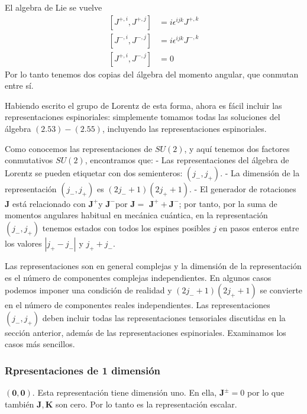                         El algebra de Lie se vuelve
                        $$
\begin{align*}
{\left[J^{+, i}, J^{+, j}\right] } & =i \epsilon^{i j k} J^{+, k}  \tag{2.53}\\
{\left[J^{-, i}, J^{-, j}\right] } & =i \epsilon^{i j k} J^{-, k}  \tag{2.54}\\
{\left[J^{+, i}, J^{-, j}\right] } & =0 \tag{2.55}
\end{align*}
$$
Por lo tanto tenemos dos copias del álgebra del momento angular, que conmutan entre sí. 

Habiendo escrito el grupo de Lorentz de esta forma, ahora es fácil incluir las representaciones espinoriales: simplemente tomamos todas las soluciones del álgebra $(2.53)-(2.55)$, incluyendo las representaciones espinoriales.

Como conocemos las representaciones de $S U(2)$, y aquí tenemos dos factores conmutativos $S U(2)$, encontramos que: - Las representaciones del álgebra de Lorentz se pueden etiquetar con dos semienteros: $\left(j_{-}, j_{+}\right)$.
- La dimensión de la representación $\left(j_{-}, j_{+}\right)$ es $\left(2 j_{-}+1\right)\left(2 j_{+}+1\right)$.
- El generador de rotaciones $\mathbf{J}$ está relacionado con $\mathbf{J}^{+}$y $\mathbf{J}^{-}$por $\mathbf{J}=$ $\mathbf{J}^{+}+\mathbf{J}^{-}$; por tanto, por la suma de momentos angulares habitual en mecánica cuántica, en la representación $\left(j_{-}, j_{+}\right)$ tenemos estados con todos los espines posibles $j$ en pasos enteros entre los valores $\left|j_{+}-j_{-}\right|$ y $j_{+}+j_{-}$.

Las representaciones son en general complejas y la dimensión de la representación es el número de componentes complejas independientes. En algunos casos podemos imponer una condición de realidad y $\left(2 j_{-}+1\right)\left(2 j_{+}+1\right)$ se convierte en el número de componentes reales independientes. Las representaciones $\left(j_{-}, j_{+}\right)$ deben incluir todas las representaciones tensoriales discutidas en la sección anterior, además de las representaciones espinoriales. Examinamos los casos más sencillos.
\subsubsection{Rpresentaciones de 1 dimensión}
$(\mathbf{0}, \mathbf{0})$. Esta representación tiene dimensión uno. En ella, $\mathbf{J}^{ \pm}=0$ por lo que también $\mathbf{J}, \mathbf{K}$ son cero. Por lo tanto es la representación escalar.
